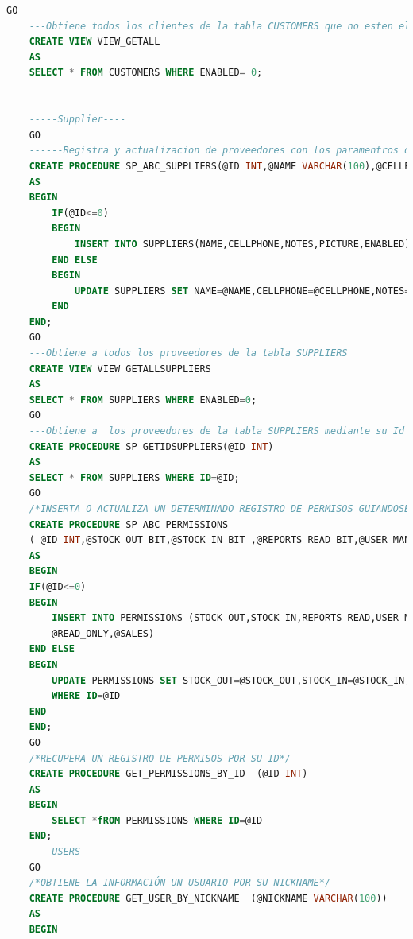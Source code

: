 \documentclass[a4paper,DIV=12]{scrreprt}
\begin{document}
\begin{lstlisting}[language={SQL}]
    GO
    ---Obtiene todos los clientes de la tabla CUSTOMERS que no esten eliminados
    CREATE VIEW VIEW_GETALL
    AS
    SELECT * FROM CUSTOMERS WHERE ENABLED= 0;
    
    
    -----Supplier----
    GO
    ------Registra y actualizacion de proveedores con los paramentros de id en caso de actulizar,nombre,telefono,etc...
    CREATE PROCEDURE SP_ABC_SUPPLIERS(@ID INT,@NAME VARCHAR(100),@CELLPHONE VARCHAR(100),@NOTES VARCHAR(MAX),@PICTURE VARCHAR(MAX),@ENABLED BIT)
    AS
    BEGIN
        IF(@ID<=0)
        BEGIN
            INSERT INTO SUPPLIERS(NAME,CELLPHONE,NOTES,PICTURE,ENABLED) VALUES (@NAME,@CELLPHONE,@NOTES,@PICTURE,@ENABLED)
        END ELSE
        BEGIN
            UPDATE SUPPLIERS SET NAME=@NAME,CELLPHONE=@CELLPHONE,NOTES=@NOTES,PICTURE=@PICTURE,ENABLED=@ENABLED WHERE ID=@ID;
        END
    END;
    GO
    ---Obtiene a todos los proveedores de la tabla SUPPLIERS
    CREATE VIEW VIEW_GETALLSUPPLIERS
    AS
    SELECT * FROM SUPPLIERS WHERE ENABLED=0;
    GO
    ---Obtiene a  los proveedores de la tabla SUPPLIERS mediante su Id
    CREATE PROCEDURE SP_GETIDSUPPLIERS(@ID INT)
    AS
    SELECT * FROM SUPPLIERS WHERE ID=@ID;
    GO
    /*INSERTA O ACTUALIZA UN DETERMINADO REGISTRO DE PERMISOS GUIANDOSE POR SU ID*/
    CREATE PROCEDURE SP_ABC_PERMISSIONS
    ( @ID INT,@STOCK_OUT BIT,@STOCK_IN BIT ,@REPORTS_READ BIT,@USER_MANAGER BIT,@READ_ONLY BIT,@SALES BIT)
    AS
    BEGIN
    IF(@ID<=0)
    BEGIN
        INSERT INTO PERMISSIONS (STOCK_OUT,STOCK_IN,REPORTS_READ,USER_MANAGER,READ_ONLY,SALES)VALUES(@STOCK_OUT,@STOCK_IN ,@REPORTS_READ ,@USER_MANAGER,
        @READ_ONLY,@SALES)
    END ELSE
    BEGIN
        UPDATE PERMISSIONS SET STOCK_OUT=@STOCK_OUT,STOCK_IN=@STOCK_IN,REPORTS_READ=@REPORTS_READ,USER_MANAGER=@USER_MANAGER,READ_ONLY=@READ_ONLY,SALES=@SALES
        WHERE ID=@ID
    END
    END;
    GO
    /*RECUPERA UN REGISTRO DE PERMISOS POR SU ID*/
    CREATE PROCEDURE GET_PERMISSIONS_BY_ID  (@ID INT)
    AS
    BEGIN
        SELECT *fROM PERMISSIONS WHERE ID=@ID
    END;
    ----USERS-----
    GO
    /*OBTIENE LA INFORMACIÓN UN USUARIO POR SU NICKNAME*/
    CREATE PROCEDURE GET_USER_BY_NICKNAME  (@NICKNAME VARCHAR(100))
    AS
    BEGIN
    

\end{lstlisting}
\end{document}

